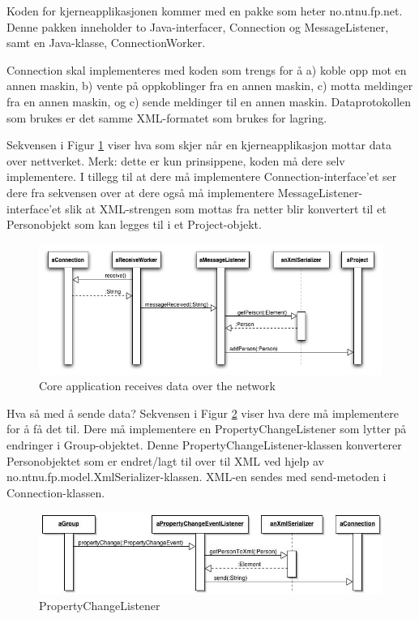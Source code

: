 Koden for kjerneapplikasjonen kommer med en pakke som heter no.ntnu.fp.net. Denne pakken inneholder to Java-interfacer, Connection og MessageListener, samt en Java-klasse, ConnectionWorker.

Connection skal implementeres med koden som trengs for å a) koble opp mot en annen maskin, b) vente på oppkoblinger fra en annen maskin, c) motta meldinger fra en annen maskin, og c) sende meldinger til en annen maskin. Dataprotokollen som brukes er det samme XML-formatet som brukes for lagring.  

Sekvensen i Figur \ref{fig:sequence-core-application-receive-data} viser hva som skjer når en kjerneapplikasjon mottar data over nettverket. Merk: dette er kun prinsippene, koden må dere selv implementere. I tillegg til at dere må implementere Connection-interface'et ser dere fra sekvensen over at dere også må implementere MessageListener-interface'et slik at XML-strengen som mottas fra netter blir konvertert til et Personobjekt som kan legges til i et Project-objekt.

\begin{figure}[H]
    \centering
    \includegraphics[width=\textwidth]{resources/sequence-core-application-receive-data.jpg}
    \caption{Core application receives data over the network}
    \label{fig:sequence-core-application-receive-data}
\end{figure}

Hva så med å sende data? Sekvensen i Figur \ref{fig:sequence-property-change-listener} viser hva dere må implementere for å få det til. Dere må implementere en PropertyChangeListener som lytter på endringer i Group-objektet. Denne PropertyChangeListener-klassen konverterer Personobjektet som er endret/lagt til over til XML ved hjelp av no.ntnu.fp.model.XmlSerializer-klassen. XML-en sendes med send-metoden i Connection-klassen.

\begin{figure}[H]
    \centering
    \includegraphics[width=\textwidth]{resources/sequence-property-change-listener.jpg}
    \caption{PropertyChangeListener}
    \label{fig:sequence-property-change-listener}
\end{figure}

